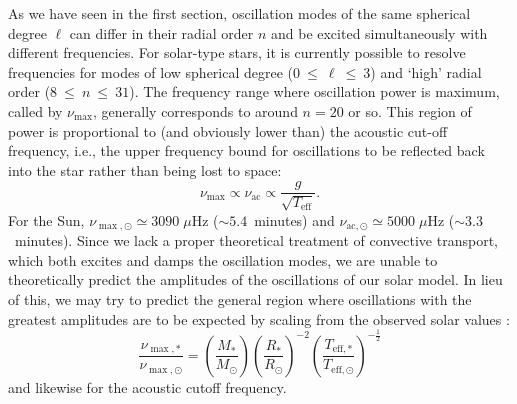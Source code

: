 As we have seen in the first section, oscillation modes of the same spherical degree $\ell$ can differ in their radial order $n$ and be excited simultaneously with different frequencies. 
For solar-type stars, it is currently possible to resolve frequencies for modes of low spherical degree (${0~\leq~\ell~\leq~3}$) and `high' radial order (${8~\leq~n~\leq~31}$). 
The frequency range where oscillation power is maximum, called by $\nu_{\max}$, generally corresponds to around ${n=20}$ or so. 
This region of power is proportional to (and obviously lower than) the acoustic cut-off frequency, i.e., the upper frequency bound for oscillations to be reflected back into the star rather than being lost to space: 
\begin{equation} \label{eq:numax}
    \nu_{\max} \propto \nu_{\text{ac}} \propto \frac{g}{\sqrt{T_{\text{eff}}}}.  %
\end{equation}
For the Sun, ${\nu_{\max,\odot} \simeq 3090\;\mu\text{Hz}}$ (${\sim 5.4}$~minutes) and ${\nu_{\text{ac},\odot} \simeq 5000\;\mu\text{Hz}}$ (${\sim 3.3}$~minutes). 
Since we lack a proper theoretical treatment of convective transport, which both excites and damps the oscillation modes, we are unable to theoretically predict the amplitudes of the oscillations of our solar model. 
In lieu of this, we may try to predict the general region where oscillations with the greatest amplitudes are to be expected by scaling from the observed solar values \citep[e.g.,][]{1995A&A...293...87K}:
\begin{equation}
    \frac{\nu_{\max,\ast}}{\nu_{\max,\odot}}
    =
    \left(
        \frac{M_\ast}{M_\odot}
    \right)
    \left(
        \frac{R_\ast}{R_\odot}
    \right)^{-2}
    \left(
        \frac{T_{\text{eff},\ast}}{T_{\text{eff},\odot}}
    \right)^{-\frac{1}{2}}
\end{equation}
and likewise for the acoustic cutoff frequency. 

